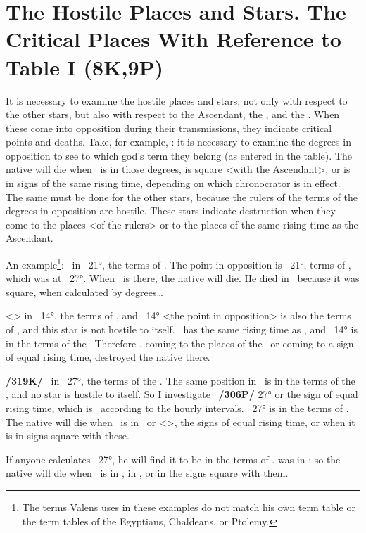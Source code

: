 \section{The Hostile Places and Stars. The Critical Places With Reference to Table I (8K,9P)}

It is necessary to examine the hostile places and stars, not only with respect to the other stars, but also with respect to the Ascendant, the \Sun, and the \Moon. When these come into opposition during their
transmissions, they indicate critical points and deaths. Take, for example, \Saturn: it is necessary to examine the degrees in opposition to see to which god’s term they belong (as entered in the table). The
native will die when \Saturn\, is in those degrees, is square <with the Ascendant>, or is in signs of the same rising time, depending on which chronocrator is in effect.  The same must be done for the other stars, because the rulers of the terms of the degrees in opposition are hostile. These stars indicate destruction when they come to the places <of the rulers> or to the places of the same rising time as the Ascendant.

An example\footnote{The terms Valens uses in these examples do not match his own term table or the term tables of the Egyptians, Chaldeans, or Ptolemy.}: \Saturn\, in \Cancer\, 21°, the terms of \Venus. The point in opposition is \Capricorn\, 21°, terms of \Mars, which was at \Taurus\, 27°. When \Saturn\, is there, the native will die. He died in \Virgo\, because it was square, when calculated by degrees…

<\Jupiter> in \Scorpio\, 14°, the terms of \Saturn, and \Taurus\, 14° <the point in opposition> is also the terms of \Saturn, and this star is not hostile to itself. \Leo\, has the same rising time as \Scorpio, and \Leo\, 14° is in the terms of the \Sun\, Therefore \Jupiter, coming to the places of the \Sun\, or coming to a sign of equal rising time, destroyed the native there.

\textbf{/319K/} \Mars\, in \Taurus\, 27°, the terms of the \Sun. The same position in \Scorpio\, is in the terms of the
\Sun, and \mndl no star is hostile to itself. So I investigate \Leo\, \textbf{/306P/} 27° or the sign of equal rising time, which is \Gemini\, according to the hourly intervals. \Gemini\, 27° is in the terms of \Venus. The native will die when \Mars\, is in \Scorpio\, or <\Aquarius>, the signs of equal rising time, or when it is in signs square with these. 

If anyone calculates \Leo\, 27°, he will find it to be in the terms of \Saturn. \Saturn was in \Cancer; so the native will die when \Mars\, is in \Cancer, in \Sagittarius, or in the signs square with them.

